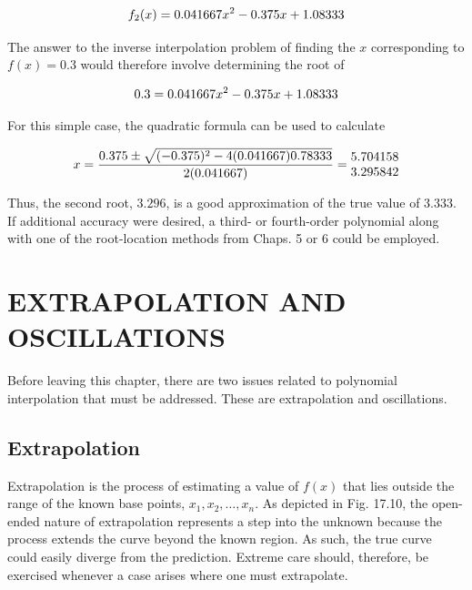 \documentclass[../main.tex]{subfiles}
\begin{document}
\begin{equation}
	\notag
	f_2 (x) =  0.041667x^2 - 0.375x + 1.08333
\end{equation}

\noindent The answer to the inverse interpolation problem of finding the $x$ corresponding to
$f (x) = 0.3$ would therefore involve determining the root of

\begin{equation}
	\notag
	0.3 = 0.041667x^2 - 0.375x + 1.08333
\end{equation}

\noindent For this simple case, the quadratic formula can be used to calculate

\begin{equation}
	\notag
	x = \frac{0.375 \pm \sqrt{(-0.375)^2 - 4(0.041667)0.78333}}{2(0.041667)} = 
	\begin{matrix}
		5.704158 \\ 3.295842
	\end{matrix}
\end{equation}

\noindent Thus, the second root, $3.296$, is a good approximation of the true value of $3.333$. If additional accuracy were desired, a third- or fourth-order polynomial along with one of the
root-location methods from Chaps. 5 or 6 could be employed.

\label{cha:cha_P_17_5} %
\section{EXTRAPOLATION AND OSCILLATIONS}

\noindent Before leaving this chapter, there are two issues related to polynomial interpolation that
must be addressed. These are extrapolation and oscillations.

\label{cha:cha_P_17_5_1} 
\subsection{Extrapolation}

\noindent Extrapolation is the process of estimating a value of $f (x)$ that lies outside the range of the
known base points, $x_1 , x_2, \dots , x_n$. As depicted in Fig. 17.10, the open-ended nature of extrapolation represents a step into the unknown because the process extends the curve
beyond the known region. As such, the true curve could easily diverge from the prediction.
Extreme care should, therefore, be exercised whenever a case arises where one must
extrapolate.
\end{document}
